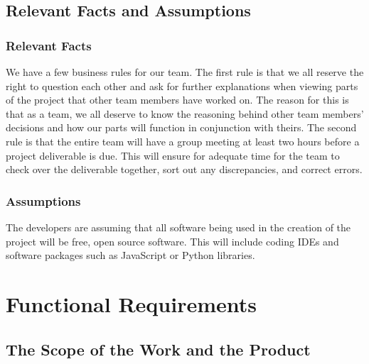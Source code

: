 \documentclass[12pt, titlepage]{article}
\begin{document}
\subsection{Relevant Facts and Assumptions}

\subsubsection{Relevant Facts}

We have a few business rules for our team.
The first rule is that we all reserve the right to question each other and ask for further explanations when viewing parts of the project that other team members have worked on. The reason for this is that as a team, we all deserve to know the reasoning behind other team members’ decisions and how our parts will function in conjunction with theirs.
The second rule is that the entire team will have a group meeting at least two hours before a project deliverable is due. This will ensure for adequate time for the team to check over the deliverable together, sort out any discrepancies, and correct errors.

\subsubsection{Assumptions}
The developers are assuming that all software being used in the creation of the project will be free, open source software. This will include coding IDEs and software packages such as JavaScript or Python libraries. 

\section{Functional Requirements}

\subsection{The Scope of the Work and the Product}
\end{document}
